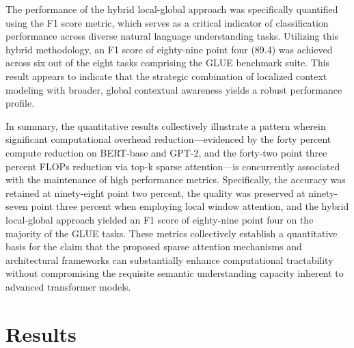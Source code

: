 \documentclass[12pt]{article}
\begin{document}
The performance of the hybrid local-global approach was specifically quantified using the F1 score metric, which serves as a critical indicator of classification performance across diverse natural language understanding tasks. Utilizing this hybrid methodology, an F1 score of eighty-nine point four (89.4) was achieved across six out of the eight tasks comprising the GLUE benchmark suite. This result appears to indicate that the strategic combination of localized context modeling with broader, global contextual awareness yields a robust performance profile.

In summary, the quantitative results collectively illustrate a pattern wherein significant computational overhead reduction—evidenced by the forty percent compute reduction on BERT-base and GPT-2, and the forty-two point three percent FLOPs reduction via top-k sparse attention—is concurrently associated with the maintenance of high performance metrics. Specifically, the accuracy was retained at ninety-eight point two percent, the quality was preserved at ninety-seven point three percent when employing local window attention, and the hybrid local-global approach yielded an F1 score of eighty-nine point four on the majority of the GLUE tasks. These metrics collectively establish a quantitative basis for the claim that the proposed sparse attention mechanisms and architectural frameworks can substantially enhance computational tractability without compromising the requisite semantic understanding capacity inherent to advanced transformer models.

\section{Results}
\end{document}
